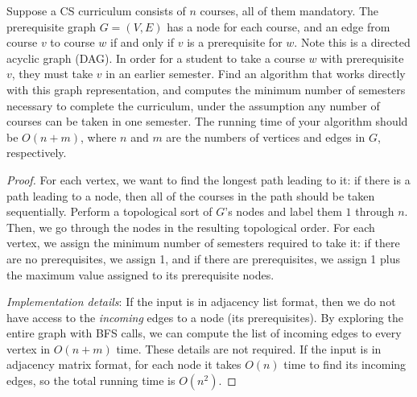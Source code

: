 \documentclass{article}
\begin{document}
    \begin{exercise}[DPV 3.16]
      Suppose a CS curriculum consists of $n$ courses, all of them mandatory. The prerequisite graph $G = (V,E)$ has a node for each course, and an edge from course $v$ to course $w$ if and only if $v$ is a prerequisite for $w$. Note this is a directed acyclic graph (DAG). In order for a student to take a course $w$ with prerequisite $v$, they must take $v$ in an earlier semester. Find an algorithm that works directly with this graph representation, and computes the minimum number of semesters necessary to complete the curriculum, under the assumption any number of courses can be taken in one semester. The running time of your algorithm should be $O(n+m)$, where $n$ and $m$ are the numbers of vertices and edges in $G$, respectively.
    \end{exercise}
    \begin{proof}
      For each vertex, we want to find the longest path leading to it: if there is a path leading to a node, then all of the courses in the path should be taken sequentially. Perform a topological sort of $G$'s nodes and label them $1$ through $n$. Then, we go through the nodes in the resulting topological order. For each vertex, we assign the minimum number of semesters required to take it: if there are no prerequisites, we assign 1, and if there are prerequisites, we assign 1 plus the maximum value assigned to its prerequisite nodes.
      
      \textit{Implementation details}: If the input is in adjacency list format, then we do not have access to the \emph{incoming} edges to a node (its prerequisites). By exploring the entire graph with BFS calls, we can compute the list of incoming edges to every vertex in $O(n+m)$ time. These details are not required. If the input is in adjacency matrix format, for each node it takes $O(n)$ time to find its incoming edges, so the total running time is $O(n^2)$.
    \end{proof}
\end{document}
